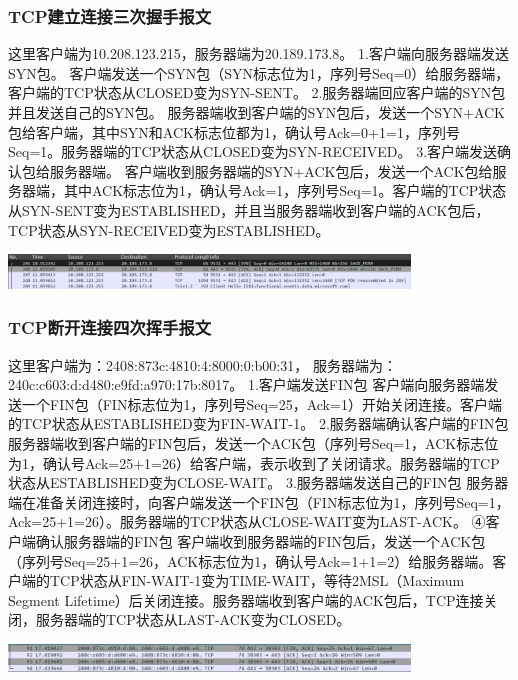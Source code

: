 \documentclass{article}
\begin{document}
\subsubsection{TCP建立连接三次握手报文}
这里客户端为10.208.123.215，服务器端为20.189.173.8。
1.客户端向服务器端发送SYN包。
客户端发送一个SYN包（SYN标志位为1，序列号Seq=0）给服务器端，客户端的TCP状态从CLOSED变为SYN-SENT。
2.服务器端回应客户端的SYN包并且发送自己的SYN包。
服务器端收到客户端的SYN包后，发送一个SYN+ACK包给客户端，其中SYN和ACK标志位都为1，确认号Ack=0+1=1，序列号Seq=1。服务器端的TCP状态从CLOSED变为SYN-RECEIVED。
3.客户端发送确认包给服务器端。
客户端收到服务器端的SYN+ACK包后，发送一个ACK包给服务器端，其中ACK标志位为1，确认号Ack=1，序列号Seq=1。客户端的TCP状态从SYN-SENT变为ESTABLISHED，并且当服务器端收到客户端的ACK包后，TCP状态从SYN-RECEIVED变为ESTABLISHED。

\vspace{10pt}
\centerline{\includegraphics[width=0.8\textwidth]{1_2_images/1.png}}
\vspace{10pt}

\subsubsection{TCP断开连接四次挥手报文}
这里客户端为：2408:873c:4810:4:8000:0:b00:31，
服务器端为：240c:c603:d:d480:e9fd:a970:17b:8017。
1.客户端发送FIN包
客户端向服务器端发送一个FIN包（FIN标志位为1，序列号Seq=25，Ack=1）开始关闭连接。客户端的TCP状态从ESTABLISHED变为FIN-WAIT-1。
2.服务器端确认客户端的FIN包
服务器端收到客户端的FIN包后，发送一个ACK包（序列号Seq=1，ACK标志位为1，确认号Ack=25+1=26）给客户端，表示收到了关闭请求。服务器端的TCP状态从ESTABLISHED变为CLOSE-WAIT。
3.服务器端发送自己的FIN包
服务器端在准备关闭连接时，向客户端发送一个FIN包（FIN标志位为1，序列号Seq=1，Ack=25+1=26）。服务器端的TCP状态从CLOSE-WAIT变为LAST-ACK。
④客户端确认服务器端的FIN包
客户端收到服务器端的FIN包后，发送一个ACK包（序列号Seq=25+1=26，ACK标志位为1，确认号Ack=1+1=2）给服务器端。客户端的TCP状态从FIN-WAIT-1变为TIME-WAIT，等待2MSL（Maximum Segment Lifetime）后关闭连接。服务器端收到客户端的ACK包后，TCP连接关闭，服务器端的TCP状态从LAST-ACK变为CLOSED。

\vspace{10pt}
\centerline{\includegraphics[width=0.8\textwidth]{1_2_images/2.png}}
\vspace{10pt}
\end{document}
